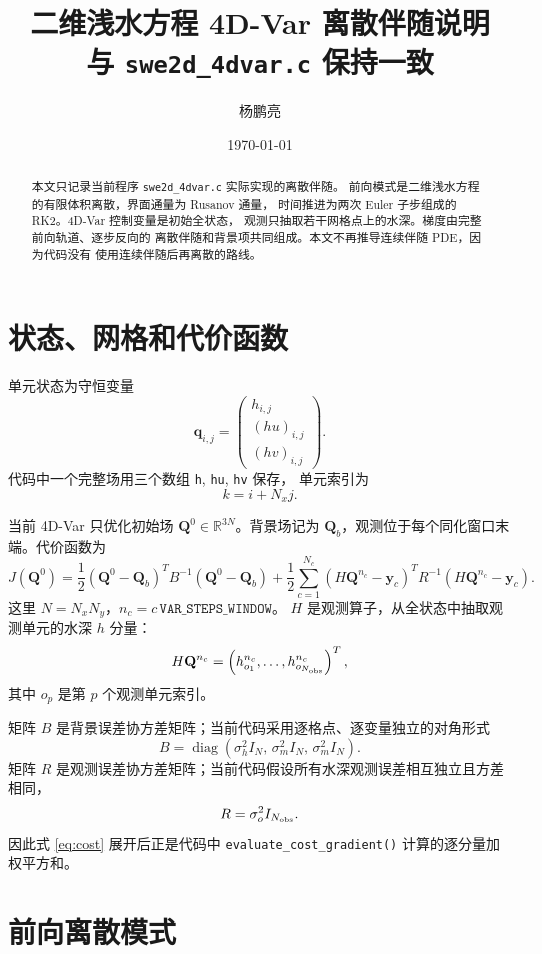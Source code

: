\documentclass[12pt,a4paper]{article}
\title{二维浅水方程 4D-Var 离散伴随说明\\
\large 与 \texttt{swe2d\_4dvar.c} 保持一致}
\author{杨鹏亮}
\date{\today}
\begin{document}
\maketitle

\begin{abstract}
本文只记录当前程序 \texttt{swe2d\_4dvar.c} 实际实现的离散伴随。
前向模式是二维浅水方程的有限体积离散，界面通量为 Rusanov 通量，
时间推进为两次 Euler 子步组成的 RK2。4D-Var 控制变量是初始全状态，
观测只抽取若干网格点上的水深。梯度由完整前向轨道、逐步反向的
离散伴随和背景项共同组成。本文不再推导连续伴随 PDE，因为代码没有
使用连续伴随后再离散的路线。
\end{abstract}

\tableofcontents

\section{状态、网格和代价函数}

单元状态为守恒变量
\[
\mathbf{q}_{i,j} =
\begin{pmatrix}
h_{i,j}\\
(hu)_{i,j}\\
(hv)_{i,j}
\end{pmatrix}.
\]
代码中一个完整场用三个数组 \texttt{h}, \texttt{hu}, \texttt{hv} 保存，
单元索引为
\[
k=i+N_x j.
\]

当前 4D-Var 只优化初始场 $\mathbf{Q}^0\in\mathbb{R}^{3N}$。背景场记为
$\mathbf{Q}_b$，观测位于每个同化窗口末端。代价函数为
\begin{equation}
J(\mathbf{Q}^0)
=
\frac12(\mathbf{Q}^0-\mathbf{Q}_b)^T B^{-1}(\mathbf{Q}^0-\mathbf{Q}_b)
+\frac12\sum_{c=1}^{N_c}
\left(H\mathbf{Q}^{n_c}-\mathbf{y}_c\right)^T
R^{-1}
\left(H\mathbf{Q}^{n_c}-\mathbf{y}_c\right).
\label{eq:cost}
\end{equation}
这里 $N=N_xN_y$，$n_c=c\,\mathtt{VAR\_STEPS\_WINDOW}$。
$H$ 是观测算子，从全状态中抽取观测单元的水深 $h$ 分量：
\[
H\mathbf{Q}^{n_c}
=
\left(h_{o_1}^{n_c},\ldots,h_{o_{N_{\rm obs}}}^{n_c}\right)^T,
\]
其中 $o_p$ 是第 $p$ 个观测单元索引。

矩阵 $B$ 是背景误差协方差矩阵；当前代码采用逐格点、逐变量独立的对角形式
\[
B=\operatorname{diag}\left(
\sigma_h^2 I_N,\,
\sigma_m^2 I_N,\,
\sigma_m^2 I_N
\right).
\]
矩阵 $R$ 是观测误差协方差矩阵；当前代码假设所有水深观测误差相互独立且方差相同，
\[
R=\sigma_o^2 I_{N_{\rm obs}}.
\]
因此式 \eqref{eq:cost} 展开后正是代码中
\texttt{evaluate\_cost\_gradient()} 计算的逐分量加权平方和。

\section{前向离散模式}
\end{document}
